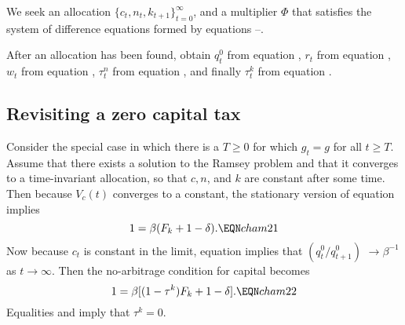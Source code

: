We seek an allocation $\{c_t, n_t, k_{t+1}\}_{t=0}^\infty$, and a
multiplier $\Phi$ that satisfies the system of difference
equations formed by equations
--.

\medskip
{}
After an allocation has been found, obtain $q^0_t$
from equation  ,  $r_t$ from equation ,  $w_t$ from
equation ,   $\tau^n_t$ from equation , and finally
$\tau^k_t$ from equation .
\subsection{Revisiting a zero capital tax}
  Consider the special case in which there
is a $T \geq 0$ for which $g_t = g$  for all $t \geq T$.
Assume that there exists a solution to the Ramsey problem and
that it converges to a  time-invariant allocation, so
that $c, n$, and $k$ are constant after some time.
Then because $V_c(t)$ converges to a constant, the
stationary version of equation 
implies
$$ 1 = \beta( F_k + 1 -\delta ).   \EQN cham21 $$
Now because $c_t$ is  constant in the limit, equation
   implies that
$\left(q^0_{t} / q^0_{t+1}\right)$ $\rightarrow \beta^{-1}$ as $t \rightarrow
\infty$.  Then the  no-arbitrage condition for capital  becomes
$$ 1 = \beta[(1-\tau^k) F_k +1-\delta]. \EQN cham22 $$
Equalities  and  imply
that $\tau^k = 0$.
